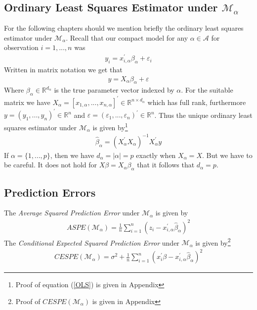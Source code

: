 \documentclass[Research_Module_ES.tex]{subfiles}
\begin{document}
\subsection{Ordinary Least Squares Estimator under $\mathcal{M}_\alpha$}
For the following chapters should we mention briefly the ordinary least squares estimator under $\mathcal{M}_\alpha$. Recall that our compact model for any $\alpha\in\mathcal{A}$ for observation $i=1,...,n$ was
\begin{align*}
	y_i=x_{i,\alpha}^\prime\beta_\alpha+\varepsilon_i
\end{align*}
Written in matrix notation we get that
\begin{align}
	y=X_\alpha \beta_\alpha+\varepsilon  \label{CM_model_matrix}
\end{align}
Where $\beta_\alpha\in\mathbb{R}^{d_\alpha}$ is the true parameter vector indexed by $\alpha$. For the suitable matrix we have $X_\alpha=[x_{1,\alpha},...,x_{n,\alpha}]^\prime \in\mathbb{R}^{n\times d_\alpha}$
which has full rank, furthermore $y=(y_1,...,y_n)^\prime\in\mathbb{R}^n$ and $\varepsilon=(\varepsilon_1,...,\varepsilon_n)^\prime\in\mathbb{R}^n$. Thus the unique %
ordinary least squares estimator under $\mathcal{M}_\alpha$ is given by\footnote{Proof of equation (\ref{OLS}) is given in Appendix }
\begin{align}
	\hat{\beta}_\alpha=(X_\alpha^\prime X_\alpha)^{-1}X_\alpha^\prime y
	\label{OLS}
\end{align}
If $\alpha=\{1,...,p\}$, then we have $d_\alpha=|\alpha|=p$ exactly when $X_\alpha=X$. But we have to be careful. It does not hold for $X\beta=X_\alpha\beta_\alpha$ that it follows that $d_\alpha=p$.

\subsection{Prediction Errors}
The \textit{Average Squared Prediction Error} under $\mathcal{M}_\alpha$ is given by
\begin{align}
ASPE(\mathcal{M}_\alpha)=\frac{1}{n}\sum_{i=1}^{n}(z_i-x_{i,\alpha}^\prime\hat{\beta}_\alpha)^2 \label{ASPE}
\end{align}
The \textit{Conditional Expected Squared Prediction Error} under $\mathcal{M}_\alpha$ is given by\footnote{Proof of $CESPE(\mathcal{M}_\alpha)$ is given in Appendix }
\begin{align*}
CESPE(\mathcal{M}_\alpha)=\sigma^2+\frac{1}{n}\sum_{i=1}^{n}(x_i^\prime\beta-x_{i,\alpha}^\prime\hat{\beta}_\alpha)^2
\end{align*}
\end{document}
